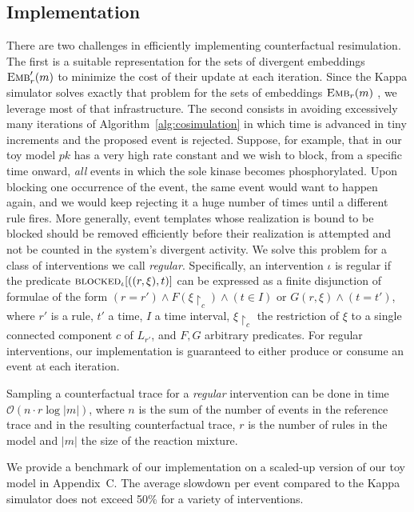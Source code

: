 
\subsection{Implementation}\label{subsec:implementation}

There are two challenges in efficiently implementing counterfactual
resimulation. The first is a suitable representation for the sets of
divergent embeddings ${\textsc{Emb}}'_{r}(m)$ to minimize the cost of their
update at each iteration. Since the Kappa simulator solves exactly
that problem for the sets of embeddings ${\textsc{Emb}}_{r}(m)$
\cite{DanosEtAl-APLAS07}, we leverage most of that infrastructure. The
second consists in avoiding excessively many iterations of
Algorithm~\ref{alg:cosimulation} in which time is advanced in tiny
increments and the proposed event is rejected.
Suppose, for example, that in our toy model
$pk$ has a very high rate constant and we wish to block, from a
specific time onward, \emph{all} events in which the sole kinase
becomes phosphorylated. Upon blocking one occurrence of the event, the
same event would want to happen again, and we would keep rejecting it
a huge number of times until a different rule fires. More generally,
event templates whose realization is bound to be blocked should be
removed efficiently before their realization is attempted and not be
counted in the system's divergent activity. We solve this problem
for a class of interventions we call \emph{regular}.
Specifically, an intervention $\iota$ is regular if
the predicate ${\textsc{blocked}}_{\iota}[((r, \xi), t)]$ can be expressed as a
finite disjunction of formulae of the form
$(r = r') \wedge F(\xi{\restriction_{c}}) \wedge (t \in I)$ or
$G(r, \xi) \wedge (t = t')$, where $r'$ is a rule, $t'$ a time, $I$ a
time interval, $\xi{\restriction_{c}}$ the restriction of $\xi$ to a
single connected component $c$ of $L_{r'}$, and $F, G$ arbitrary
predicates. For regular interventions, our implementation is
guaranteed to either produce or consume an event at each iteration.

\begin{proposition}
  Sampling a counterfactual trace for a \emph{regular} intervention
  can be done in time $\mathcal{O}(n \cdot r \log|m|)$, where $n$ is
  the sum of the number of events in the reference trace and in the
  resulting counterfactual trace, $r$ is the number of rules in the
  model and $|m|$ the size of the reaction mixture.
\end{proposition}

We provide a benchmark of our implementation on a scaled-up version of
our toy model in Appendix~C. The average slowdown per
event compared to the Kappa simulator does not exceed 50\% for a
variety of interventions.

\medskip